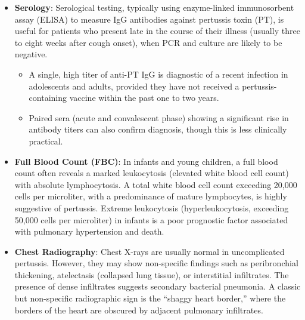 \begin{itemize}
\begin{itemize}
        \item It takes 3 to 7 days for the bacteria to grow, which delays diagnosis and treatment.
    \end{itemize}
    \item \textbf{Serology}: Serological testing, typically using enzyme-linked immunosorbent assay (ELISA) to measure IgG antibodies against pertussis toxin (PT), is useful for patients who present late in the course of their illness (usually three to eight weeks after cough onset), when PCR and culture are likely to be negative.
    \begin{itemize}
        \item A single, high titer of anti-PT IgG is diagnostic of a recent infection in adolescents and adults, provided they have not received a pertussis-containing vaccine within the past one to two years.
        \item Paired sera (acute and convalescent phase) showing a significant rise in antibody titers can also confirm diagnosis, though this is less clinically practical.
    \end{itemize}
    \item \textbf{Full Blood Count (FBC)}: In infants and young children, a full blood count often reveals a marked leukocytosis (elevated white blood cell count) with absolute lymphocytosis. A total white blood cell count exceeding 20,000 cells per microliter, with a predominance of mature lymphocytes, is highly suggestive of pertussis. Extreme leukocytosis (hyperleukocytosis, exceeding 50,000 cells per microliter) in infants is a poor prognostic factor associated with pulmonary hypertension and death.
    \item \textbf{Chest Radiography}: Chest X-rays are usually normal in uncomplicated pertussis. However, they may show non-specific findings such as peribronchial thickening, atelectasis (collapsed lung tissue), or interstitial infiltrates. The presence of dense infiltrates suggests secondary bacterial pneumonia. A classic but non-specific radiographic sign is the ``shaggy heart border,'' where the borders of the heart are obscured by adjacent pulmonary infiltrates.
\end{itemize}

